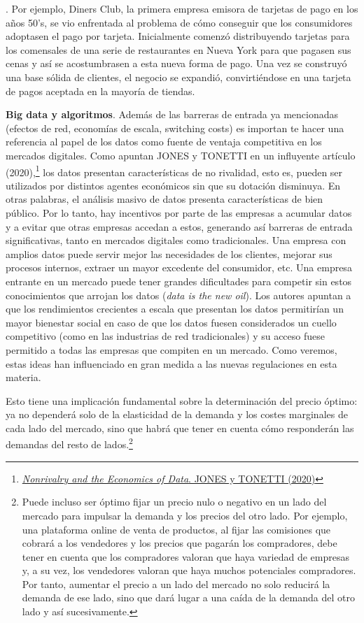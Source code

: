 \documentclass[10pt,a4paper]{article}
\newcounter{numitem}
\newenvironment{lnum}
      {\begin{list}{\arabic{numitem}.}{%
          \usecounter{numitem}%
          \setlength{\leftmargin}{1cm}%
          \setlength{\parskip}{3pt}%
          \setlength{\itemsep}{0pt}%
          \setlength{\parsep}{0pt}%
      }}
      {\end{list}}
\begin{document}
\begin{lnum}
{        Por ejemplo, Diners Club, la primera empresa emisora de tarjetas de pago en los años 50's, se vio enfrentada al problema de cómo conseguir que los consumidores adoptasen el pago por tarjeta. Inicialmente comenzó distribuyendo tarjetas para los comensales de una serie de restaurantes en Nueva York para que pagasen sus cenas y así se acostumbrasen a esta nueva forma de pago. Una vez se construyó una base sólida de clientes, el negocio se expandió, convirtiéndose en una tarjeta de pagos aceptada en la mayoría de tiendas.
    }
    \item \textbf{Big data y algoritmos}. Además de las barreras de entrada ya mencionadas (efectos de red, economías de escala, switching costs) es importan te hacer una referencia al papel de los datos como fuente de ventaja competitiva en los mercados digitales. Como apuntan JONES y TONETTI en un influyente artículo (2020),\footnote{\href{}{\textit{Nonrivalry and the Economics of Data}. JONES y TONETTI (2020)}
    } los datos presentan características de no rivalidad, esto es, pueden ser utilizados por distintos agentes económicos sin que su dotación disminuya. En otras palabras, el análisis masivo de datos presenta características de bien público. Por lo tanto, hay incentivos por parte de las empresas a acumular datos y a evitar que otras empresas accedan a estos, generando así barreras de entrada significativas, tanto en mercados digitales como tradicionales. Una empresa con amplios datos puede servir mejor las necesidades de los clientes, mejorar sus procesos internos, extraer un mayor excedente del consumidor, etc. Una empresa entrante en un mercado puede tener grandes dificultades para competir sin estos conocimientos que arrojan los datos (\textit{data is the new oil}). Los autores apuntan a que los rendimientos crecientes a escala que presentan los datos permitirían un mayor bienestar social en caso de que los datos fuesen considerados un cuello competitivo (como en las industrias de red tradicionales) y su acceso fuese permitido a todas las empresas que compiten en un mercado. Como veremos, estas ideas han influenciado en gran medida a las nuevas regulaciones en esta materia.  
\end{lnum}


Esto tiene una implicación fundamental sobre la determinación del precio óptimo: ya no dependerá solo de la elasticidad de la demanda y los costes marginales de cada lado del mercado, sino que habrá que tener en cuenta cómo responderán las demandas del resto de lados.\footnote{%
    Puede incluso ser óptimo fijar un precio nulo o negativo en un lado del mercado para impulsar la demanda y los precios del otro lado.  Por ejemplo, una plataforma online de venta de productos, al fijar las comisiones que cobrará a los vendedores y los precios que pagarán los compradores, debe tener en cuenta que los compradores valoran que haya variedad de empresas y, a su vez, los vendedores valoran que haya muchos potenciales compradores. Por tanto, aumentar el precio a un lado del mercado no solo reducirá la demanda de ese lado, sino que dará lugar a una caída de la demanda del otro lado y así sucesivamente.
} 
\end{document}

